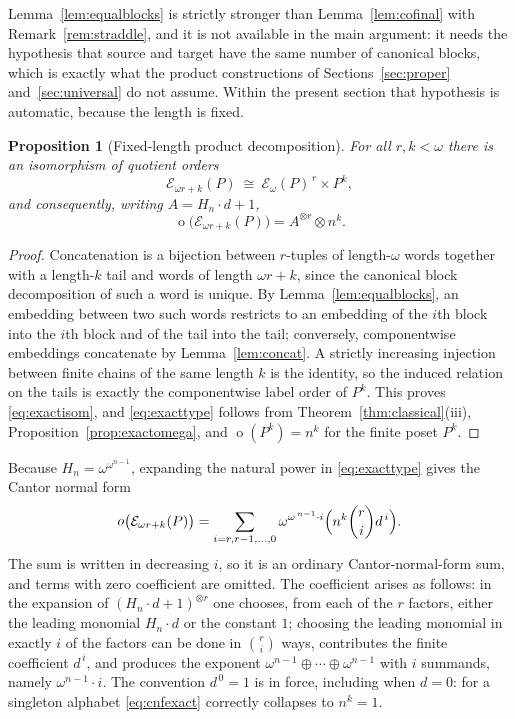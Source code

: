 \documentclass[11pt,a4paper]{article}
\numberwithin{equation}{section}
\newtheorem{proposition}[theorem]{Proposition}
\theoremstyle{definition}
\theoremstyle{remark}
\newcommand{\mot}{\mathop{o}}
\newcommand{\Hn}[1]{H_{#1}}
\newcommand{\E}{\mathcal E}
\begin{document}
Lemma~\ref{lem:equalblocks} is strictly stronger than
Lemma~\ref{lem:cofinal} with Remark~\ref{rem:straddle}, and it is not
available in the main argument: it needs the hypothesis that source and target
have the same number of canonical blocks, which is exactly what the product
constructions of Sections~\ref{sec:proper} and~\ref{sec:universal} do not
assume. Within the present section that hypothesis is automatic, because the
length is fixed.

\begin{proposition}[Fixed-length product decomposition]\label{prop:exactproduct}
For all $r,k<\omega$ there is an isomorphism of quotient orders
\begin{equation}\label{eq:exactisom}
 \E_{\omega r+k}(P)\ \cong\ \E_\omega(P)^{\,r}\times P^{k},
\end{equation}
and consequently, writing $A=\Hn n\cdot d+1$,
\begin{equation}\label{eq:exacttype}
 \mot\bigl(\E_{\omega r+k}(P)\bigr)=A^{\otimes r}\otimes n^{k}.
\end{equation}
\end{proposition}
\begin{proof}
Concatenation is a bijection between $r$-tuples of length-$\omega$ words
together with a length-$k$ tail and words of length $\omega r+k$, since the
canonical block decomposition of such a word is unique. By
Lemma~\ref{lem:equalblocks}, an embedding between two such words restricts to
an embedding of the $i$th block into the $i$th block and of the tail into the
tail; conversely, componentwise embeddings concatenate by
Lemma~\ref{lem:concat}. A strictly increasing injection between finite chains
of the same length $k$ is the identity, so the induced relation on the tails
is exactly the componentwise label order of $P^k$. This proves
\eqref{eq:exactisom}, and \eqref{eq:exacttype} follows from
Theorem~\ref{thm:classical}(iii), Proposition~\ref{prop:exactomega}, and
$\mot(P^k)=n^k$ for the finite poset $P^k$.
\end{proof}

Because $\Hn n=\omega^{\omega^{n-1}}$, expanding the natural power in
\eqref{eq:exacttype} gives the Cantor normal form
\begin{equation}\label{eq:cnfexact}
 \mot\bigl(\E_{\omega r+k}(P)\bigr)
  =\sum_{i=r,r-1,\ldots,0}
     \omega^{\omega^{\,n-1}\cdot i}\Bigl(n^{k}\binom ri d^{\,i}\Bigr).
\end{equation}
The sum is written in decreasing $i$, so it is an ordinary Cantor-normal-form
sum, and terms with zero coefficient are omitted. The coefficient arises as
follows: in the expansion of $(\Hn n\cdot d+1)^{\otimes r}$ one chooses, from
each of the $r$ factors, either the leading monomial $\Hn n\cdot d$ or the
constant $1$; choosing the leading monomial in exactly $i$ of the factors can
be done in $\binom ri$ ways, contributes the finite coefficient $d^{\,i}$, and
produces the exponent $\omega^{n-1}\oplus\cdots\oplus\omega^{n-1}$ with $i$
summands, namely $\omega^{n-1}\cdot i$. The convention $d^{\,0}=1$ is in
force, including when $d=0$: for a singleton alphabet
\eqref{eq:cnfexact} correctly collapses to $n^k=1$.
\end{document}
